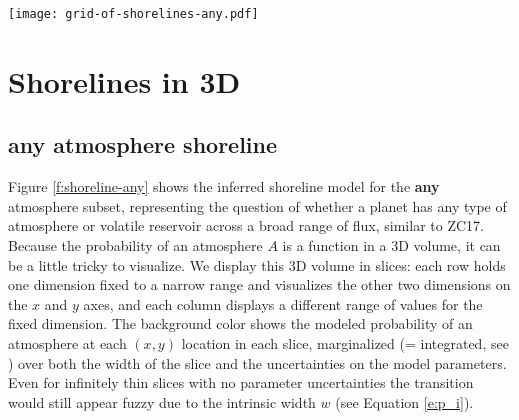 \documentclass[modern,linenumbers,trackchanges]{aastex7}
\begin{document}
\begin{figure*}[ht!]
\texttt{[image: grid-of-shorelines-any.pdf]}
\caption{A cosmic shoreline dividing exoplanets (errorbars) and Solar System planets (squares) with {\bf any} type of atmosphere or global surface volatiles (blue symbols, $A_{\sf{i}}=1$) from those without (brown symbols, $A_{\sf{i}}=0$). Planets without definitive atmosphere constraints are shown for context (gray symbols, $A_{\sf{i}}=?$). The shoreline defines a plane in the 3D space of ($f$, $v_{\sf esc}$, $L$); each row shows slices that consider a narrow range of stellar luminosity (top), planet escape velocity (middle), and planet flux (bottom). Background colors indicate the modeled probability of an atmosphere at each location (sandy brown for $p_{\sf i} = 0$, water blue for $p_{\sf i}$ = 1), accounting for the intrinsic width of the shoreline and marginalizing over the parameter uncertainties and the width of the slice; contours (dashed lines) highlight atmosphere probabilities of 5\%, 50\%, 95\% (\href{https://github.com/zkbt/shoreline/blob/main/notebooks/plot-shorelines.ipynb}{\texttt{</>}}).}
\label{f:shoreline-any}
\end{figure*}


\section{Shorelines in 3D}
\label{s:shorelines}

\subsection{{\bf any} atmosphere shoreline}
Figure \ref{f:shoreline-any} shows the inferred shoreline model for the {\bf any} atmosphere subset, representing the question of whether a planet has any type of atmosphere or volatile reservoir across a broad range of flux, similar to ZC17. Because the probability of an atmosphere $A$ is a function in a 3D volume, it can be a little tricky to visualize. We display this 3D volume in slices: each row holds one dimension fixed to a narrow range and visualizes the other two dimensions on the $x$ and $y$ axes, and each column displays a different range of values for the fixed dimension. The background color shows the modeled probability of an atmosphere at each $(x, y)$ location in each slice, marginalized (= integrated, see \citealt{hoggDataAnalysisRecipes2010a, siviaDataAnalysisBayesian2011, vanderplasFrequentismBayesianismPythondriven2014a, ivezicStatisticsDataMining2020}) over both the width of the slice and the uncertainties on the model parameters. Even for infinitely thin slices with no parameter uncertainties the transition would still appear fuzzy due to the intrinsic width $w$ (see Equation \ref{e:p_i}). 
\end{document}
